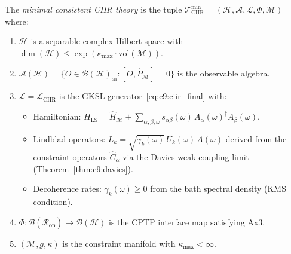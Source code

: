 \begin{definition}
\label{def:c9:minimal}
The \emph{minimal consistent CIIR theory} is the tuple
$\mathcal{T}_{\mathrm{CIIR}}^{\min} = (\mathcal{H}, \mathcal{A},
\mathcal{L}, \Phi, \mathcal{M})$ where:
\begin{enumerate}
\item $\mathcal{H}$ is a separable complex Hilbert space with
  $\dim(\mathcal{H}) \leq \exp(\kappa_{\max} \cdot \mathrm{vol}(\mathcal{M}))$.

\item $\mathcal{A}(\mathcal{H}) = \{O \in \mathcal{B}(\mathcal{H})_{\mathrm{sa}} :
  [O, \hat{P}_{\mathcal{M}}] = 0\}$ is the observable algebra.

\item $\mathcal{L} = \mathcal{L}_{\mathrm{CIIR}}$ is the GKSL
  generator~\eqref{eq:c9:ciir_final} with:
  \begin{itemize}
  \item Hamiltonian: $H_{\mathrm{LS}} = \hat{H}_{\mathcal{M}} +
    \sum_{\alpha,\beta,\omega} s_{\alpha\beta}(\omega)\,
    A_\alpha(\omega)^\dagger A_\beta(\omega)$.
  \item Lindblad operators: $L_k = \sqrt{\gamma_k(\omega)}\, U_k(\omega)\,
    A(\omega)$ derived from the constraint operators $\hat{C}_\alpha$
    via the Davies weak-coupling limit (Theorem~\ref{thm:c9:davies}).
  \item Decoherence rates: $\gamma_k(\omega) \geq 0$ from the bath
    spectral density (KMS condition).
  \end{itemize}

\item $\Phi : \mathcal{B}(\mathcal{R}_{\mathrm{op}}) \to
  \mathcal{B}(\mathcal{H})$ is the CPTP interface map satisfying Ax3.

\item $(\mathcal{M}, g, \kappa)$ is the constraint manifold with
  $\kappa_{\max} < \infty$.
\end{enumerate}
\end{definition}

